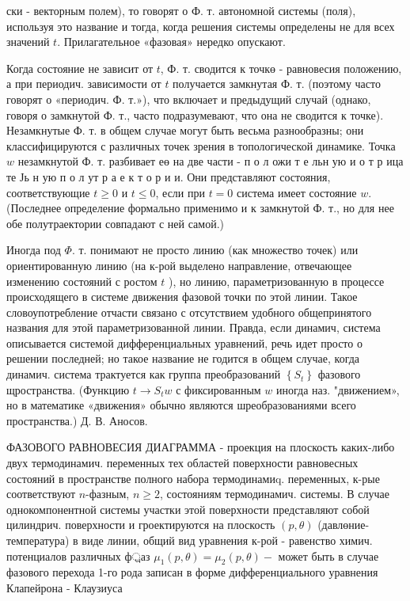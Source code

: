 \documentclass[10pt]{article}
\begin{document}
ски - векторным полем), то говорят о Ф. т. автономной системы (поля), используя это название и тогда, когда решения системы определены не для всех значений $t$. Прилагательное «фазовая» нередко опускают.



Когда состояние не зависит от $t$, Ф. т. сводится к точкө - равновесия положению, а при периодич. зависимости от $t$ получается замкнутая Ф. т. (поэтому часто говорят о «периодич. Ф. т.»), что включает и предыдущий случай (однако, говоря о замкнутой Ф. т., часто подразумевают, что она не сводится к точке). Незамкнутые Ф. т. в общем случае могут быть весьма разнообразны; они классифицируются с различных точек зрения в топологической динамике. Точка $w$ незамкнутой Ф. т. разбивает еө на две части - п о л ожи т е льн ую и о т р ица те Јь н ую п о л ут р а е к т о р и и. Они представляют состояния, соответствующие $t \geqslant 0$ и $t \leqslant 0$, если при $t=0$ система имеет состояние $w$. (Последнее определение формально применимо и к замкнутой Ф. т., но для нее обе полутраектории совпадают с ней самой.)



Иногда под $\Phi$. т. понимают не просто линию (как множество точек) или ориентированную линию (на к-рой выделено направление, отвечающее изменению состояний с ростом $t$ ), но линию, параметризованную в процессе происходящего в системе движения фазовой точки по этой линии. Такое словоупотребление отчасти связано с отсутствием удобного общепринятого названия для этой параметризованной линии. Правда, если динамич, система описывается системой дифференциальных уравнений, речь идет просто о решении последней; но такое название не годится в общем случае, когда динамич. система трактуется как группа преобразований $\left\{S_{t}\right\}$ фазового щространства. (Функцию $t \rightarrow S_{t} w$ с фиксированным $w$ иногда наз. "движением», но в математике «движения» обычно являются шреобразованиями всего пространства.) Д. В. Аносов.



ФАЗОВОГО РАВНОВЕСИЯ ДИАГРАММА - проекция на плоскость каких-либо двух термодинамич. переменных тех областей поверхности равновесных состояний в пространстве полного набора термодинамиq. переменных, к-рые соответствуют $n$-фазным, $n \geqslant 2$, состояниям термодинамич. системы. В случае однокомпонентной системы участки этой поверхности представляют собой цилиндрич. поверхности и гроектируются на плоскость $(p, \theta)$ (давлөние-температура) в виде линии, общий вид уравнения к-рой - равенство химич. потенциалов различных ф্রаз $\mu_{1}(p, \theta)=\mu_{2}(p, \theta)-$ может быть в случае фазового перехода 1-го рода записан в форме дифференциального уравнения Клапейрона - Клаузиуса
\end{document}
